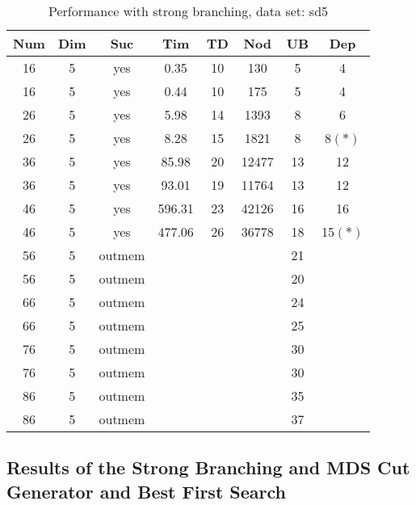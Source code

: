 \begin{table}[!htb]
  \centering
  \begin{tabular}[center]{|c|c|c|c|c|c|c|c|}
    \hline
    Num & Dim & Suc & Tim & TD & Nod & UB & Dep \\
    \hline
    16 & 5 & yes & 0.35 & 10 & 130 & 5 & 4 \\
    16 & 5 & yes & 0.44 & 10 & 175 & 5 & 4 \\
    26 & 5 & yes & 5.98 & 14 & 1393 & 8 & 6 \\
    26 & 5 & yes & 8.28 & 15 & 1821 & 8 & 8$(*)$ \\
    36 & 5 & yes & 85.98 & 20 & 12477 & 13 & 12 \\
    36 & 5 & yes & 93.01 & 19 & 11764 & 13 & 12 \\
    46 & 5 & yes & 596.31 & 23 & 42126 & 16 & 16 \\
    46 & 5 & yes & 477.06 & 26 & 36778 & 18 & 15$(*)$ \\
    56 & 5 & outmem &&&& 21 &\\
    56 & 5 & outmem &&&& 20 &\\
    66 & 5 & outmem &&&& 24 &\\
    66 & 5 & outmem &&&& 25 &\\
    76 & 5 & outmem &&&& 30 &\\
    76 & 5 & outmem &&&& 30 &\\
    86 & 5 & outmem &&&& 35 &\\
    86 & 5 & outmem &&&& 37 &\\
    \hline
  \end{tabular}
  \caption{Performance with strong branching, data set: sd5}
  \label{tab:test.bran-sd5}
\end{table}


\clearpage
\subsection{Results of the Strong Branching and MDS Cut Generator and Best First Search}
\label{sec:apd.bac.cutmds}

